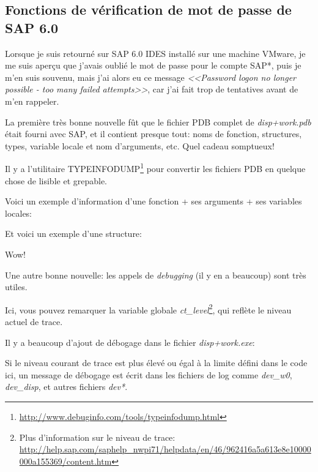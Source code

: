 \subsection{Fonctions de vérification de mot de passe de SAP 6.0}


Lorsque je suis retourné sur SAP 6.0 IDES installé sur une machine VMware, je me
suis aperçu que j'avais oublié le mot de passe pour le compte SAP*, puis je m'en 
suis souvenu, mais j'ai alors eu ce message
\emph{<<Password logon no longer possible - too many failed attempts>>},
car j'ai fait trop de tentatives avant de m'en rappeler.


La première très bonne nouvelle fût que le fichier \gls{PDB} complet de \emph{disp+work.pdb}
était fourni avec SAP, et il contient presque tout: noms de fonction, structures,
types, variable locale et nom d'arguments, etc. Quel cadeau somptueux!

Il y a l'utilitaire TYPEINFODUMP\footnote{\url{http://www.debuginfo.com/tools/typeinfodump.html}} pour
convertir les fichiers \gls{PDB} en quelque chose de lisible et grepable.

Voici un exemple d'information d'une fonction + ses arguments + ses variables locales:



Et voici un exemple d'une structure:



Wow!

Une autre bonne nouvelle: les appels de \emph{debugging} (il y en a beaucoup) sont
très utiles.

Ici, vous pouvez remarquer la variable globale \emph{ct\_level}\footnote{Plus d'information
sur le niveau de trace: \url{http://help.sap.com/saphelp_nwpi71/helpdata/en/46/962416a5a613e8e10000000a155369/content.htm}}, qui reflète le niveau
actuel de trace.

Il y a beaucoup d'ajout de débogage dans le fichier \emph{disp+work.exe}:



Si le niveau courant de trace est plus élevé ou égal à la limite défini dans le code
ici, un message de débogage est écrit dans les fichiers de log comme \emph{dev\_w0},
\emph{dev\_disp}, et autres fichiers \emph{dev*}.

\myindex{\GrepUsage}

